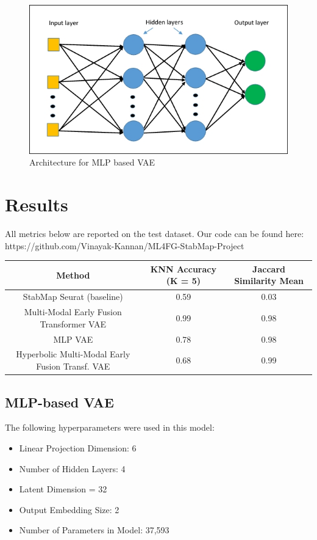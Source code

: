 \documentclass[11pt,a4paper]{article}
\begin{document}
\begin{figure}[H]
    \centering
    \includegraphics[width=0.5\linewidth]{mlp.png}
    \caption{Architecture for MLP based VAE}
    \label{fig:enter-label}
\end{figure}


\section{Results}

All metrics below are reported on the test dataset. Our code can be found here: https://github.com/Vinayak-Kannan/ML4FG-StabMap-Project
\begin{center}
\begin{tabular}{||c c c||} 
 \hline
 Method & KNN Accuracy (K = 5) & Jaccard Similarity Mean  \\ [0.5ex] 
 \hline\hline
 StabMap Seurat (baseline) & 0.59 & 0.03 \\ 
 \hline
 Multi-Modal Early Fusion Transformer VAE & 0.99 & 0.98 \\
 \hline
 MLP VAE & 0.78 & 0.98 \\
 \hline
 Hyperbolic Multi-Modal Early Fusion Transf. VAE & 0.68 & 0.99 \\
 \hline
\end{tabular}
\end{center}

\subsection{MLP-based VAE}
The following hyperparameters were used in this model:
 \begin{itemize}
     \item Linear Projection Dimension: 6
     \item Number of Hidden Layers: 4
     \item Latent Dimension = 32
     \item Output Embedding Size: 2
     \item Number of Parameters in Model: 37,593
 \end{itemize}
\end{document}
